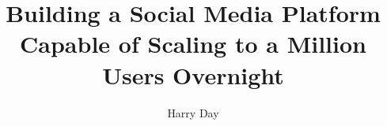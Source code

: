 \documentclass[12pt]{third-rep}
\title{Building a Social Media Platform Capable of Scaling to a Million Users Overnight}
\author{Harry Day}
\begin{document}
\dotitleandabstract

\tableofcontents
\listoffigures
\listoftables









\appendix

\end{document}
